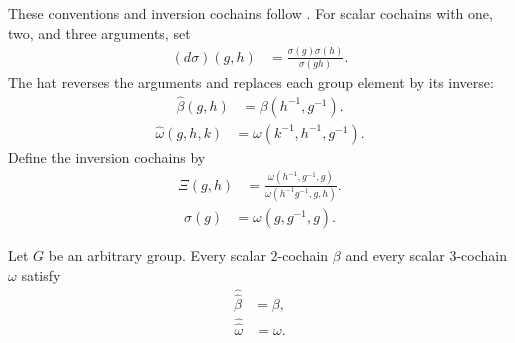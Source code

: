 \begin{definition}
    \label{def:mpug_inversion_cochains}
    \leanok
    These conventions and inversion cochains follow
    \cite[lines~5910--5916 and 5967--5973]{FrancoRubio2025MPUGauging}.
    For scalar cochains with one, two, and three arguments, set
    \begin{align}
        (d\sigma)(g,h) & =\frac{\sigma(g)\sigma(h)}{\sigma(gh)}.
        \label{eq:mpug_one_coboundary}
    \end{align}
    The hat reverses the arguments and replaces each group element by its
    inverse:
    \begin{align}
        \widehat\beta(g,h) & =\beta(h^{-1},g^{-1}).
        \label{eq:mpug_two_hat}
    \end{align}
    \begin{align}
        \widehat\omega(g,h,k) & =\omega(k^{-1},h^{-1},g^{-1}).
        \label{eq:mpug_three_hat}
    \end{align}
    Define the inversion cochains by
    \begin{align}
        \Xi(g,h) & =
        \frac{\omega(h^{-1},g^{-1},g)}
        {\omega(h^{-1}g^{-1},g,h)}.
        \label{eq:mpug_intro_Xi}
    \end{align}
    \begin{align}
        \sigma(g) & =\omega(g,g^{-1},g).
        \label{eq:mpug_intro_sigma}
    \end{align}
\end{definition}

\begin{lemma}
    \label{thm:mpug_scalar_hat_involution}
    \leanok
    Let $G$ be an arbitrary group. Every scalar $2$-cochain $\beta$ and every
    scalar $3$-cochain $\omega$ satisfy
    \begin{align}
        \widehat{\widehat\beta} & =\beta,
        \label{eq:mpug_two_hat_hat}
    \end{align}
    \begin{align}
        \widehat{\widehat\omega} & =\omega.
        \label{eq:mpug_three_hat_hat}
    \end{align}
\end{lemma}

